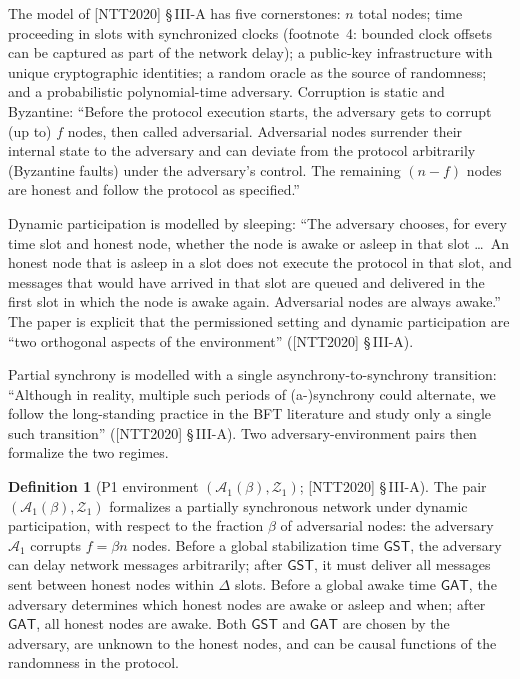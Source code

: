 \documentclass[11pt,a4paper]{article}
\theoremstyle{definition}
\newtheorem{definition}[theorem]{Definition}
\begin{document}
The model of [NTT2020] \S\,III-A has five cornerstones: $n$ total nodes;
time proceeding in slots with synchronized clocks (footnote~4: bounded
clock offsets can be captured as part of the network delay); a public-key
infrastructure with unique cryptographic identities; a random oracle as
the source of randomness; and a probabilistic polynomial-time adversary.
Corruption is static and Byzantine: ``Before the protocol execution
starts, the adversary gets to corrupt (up to) $f$ nodes, then called
adversarial. Adversarial nodes surrender their internal state to the
adversary and can deviate from the protocol arbitrarily (Byzantine faults)
under the adversary's control. The remaining $(n - f)$ nodes are honest
and follow the protocol as specified.''

Dynamic participation is modelled by sleeping: ``The adversary chooses,
for every time slot and honest node, whether the node is awake or asleep
in that slot \dots\ An honest node that is asleep in a slot does not
execute the protocol in that slot, and messages that would have arrived in
that slot are queued and delivered in the first slot in which the node is
awake again. Adversarial nodes are always awake.'' The paper is explicit
that the permissioned setting and dynamic participation are ``two
orthogonal aspects of the environment'' ([NTT2020] \S\,III-A).

Partial synchrony is modelled with a single asynchrony-to-synchrony
transition: ``Although in reality, multiple such periods of (a-)synchrony
could alternate, we follow the long-standing practice in the BFT
literature and study only a single such transition'' ([NTT2020]
\S\,III-A). Two adversary-environment pairs then formalize the two
regimes.

\begin{definition}[P1 environment $(\mathcal{A}_1(\beta), \mathcal{Z}_1)$;
{[NTT2020]} \S\,III-A]\label{def:xl-env-p1}
The pair $(\mathcal{A}_1(\beta), \mathcal{Z}_1)$ formalizes a partially
synchronous network under dynamic participation, with respect to the
fraction $\beta$ of adversarial nodes: the adversary $\mathcal{A}_1$
corrupts $f = \beta n$ nodes. Before a global stabilization time
$\mathsf{GST}$, the adversary can delay network messages arbitrarily;
after $\mathsf{GST}$, it must deliver all messages sent between honest
nodes within $\Delta$ slots. Before a global awake time $\mathsf{GAT}$,
the adversary determines which honest nodes are awake or asleep and when;
after $\mathsf{GAT}$, all honest nodes are awake. Both $\mathsf{GST}$ and
$\mathsf{GAT}$ are chosen by the adversary, are unknown to the honest
nodes, and can be causal functions of the randomness in the protocol.
\end{definition}
\end{document}
